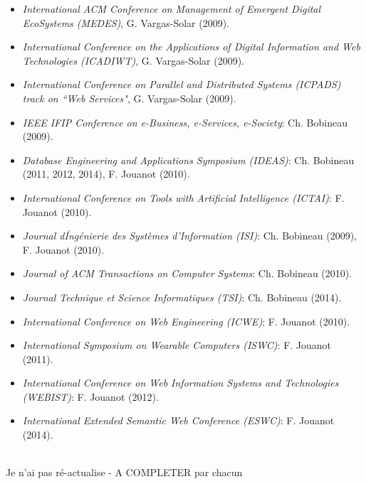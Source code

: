 \begin{itemize}
\item {\it International ACM Conference on Management of Emergent Digital EcoSystems (MEDES)}, G. Vargas-Solar (2009).

\item {\it International Conference on the Applications of Digital Information and Web Technologies (ICADIWT)}, G. Vargas-Solar (2009).

\item {\it International Conference on Parallel and Distributed Systems (ICPADS) track on ``Web Services"}, G. Vargas-Solar (2009).

\item {\it IEEE IFIP Conference on e-Business, e-Services, e-Society}: Ch. Bobineau (2009).

\item {\it Database Engineering and Applications Symposium (IDEAS)}: Ch. Bobineau (2011, 2012, 2014), F. Jouanot (2010).

\item {\it International Conference on Tools with Artificial Intelligence (ICTAI)}: F. Jouanot (2010).

\item {\it Journal d\'Ing\'enierie des Syst\`emes d'Information (ISI)}: Ch. Bobineau (2009), F. Jouanot (2010). 

\item {\it Journal of ACM Transactions on Computer Systems}: Ch. Bobineau (2010).

\item {\it Journal Technique et Science Informatiques (TSI)}: Ch. Bobineau (2014).

\item {\it International Conference on Web Engineering (ICWE)}: F. Jouanot (2010).

\item {\it International Symposium on Wearable Computers (ISWC)}: F. Jouanot (2011).

\item {\it International Conference on Web Information Systems and Technologies (WEBIST)}: F. Jouanot (2012).

\item {\it International Extended Semantic Web Conference (ESWC)}: F. Jouanot (2014).

\end{itemize}

\ \\
Je n'ai pas r{\'e}-actualise - A COMPLETER par chacun 
\ \\

